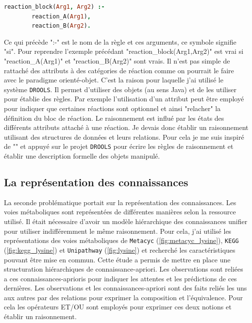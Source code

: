 \begin{refsegment}
\begin{lstlisting}[basicstyle=\small\normalfont\ttfamily,language=Prolog]
    reaction_block(Arg1, Arg2) :-
        reaction_A(Arg1),
        reaction_B(Arg2).
\end{lstlisting}

Ce qui précède  ":-" est le nom de la règle et ces arguments, ce symbole signifie "si". Pour reprendre l'exemple précédant "reaction\_block(Arg1,Arg2)" est vrai si "reaction\_A(Arg1)" et "reaction\_B(Arg2)" sont vrais. Il n'est pas simple de rattaché des attributs à des catégories de réaction comme on pourrait le faire avec le paradigme orienté-objet. C'est la raison pour laquelle j'ai utilisé le système \texttt{DROOLS}. Il permet d'utiliser des objets (au sens Java)  et de les utiliser pour établie des règles. Par exemple l'utilisation d'un attribut peut être employé pour indiquer que certaines réactions sont optionnel et ainsi "relacher" la définition du bloc de réaction. Le raisonnement est influé par les états des différents attributs attaché à une réaction. Je devais donc établir un raisonnement utilisant des structures de données et leurs relations. Pour cela je me suis inspiré de "" \cite{amir1999object} et appuyé sur le projet \texttt{DROOLS} \cite{mcwhirter2001drools} pour écrire les règles de raisonnement et établir une description formelle des objets manipulé.

\subsection{La représentation des connaissances}

La seconde problématique portait sur la représentation des connaissances. Les voies métaboliques sont représentées de différentes manières selon la ressource utilisé. Il était nécessaire d'avoir un modèle hiérarchique des connaissances unifier pour utiliser indifféremment le même raisonnement. Pour cela, j'ai utilisé les représentations des voies métaboliques de \texttt{Metacyc} (\cref{fig:metacyc_lysine}), \texttt{KEGG} (\cref{fig:kegg_lysine}) et \texttt{Unipathway} (\cref{fig:lysine}) et recherché les caractéristiques pouvant être mise en commun. Cette étude a permis de mettre en place une structuration hiérarchiques de connaissance-apriori. Les observations sont reliées a ces connaissances-aprioris pour indiquer les attentes et les prédictions de ces dernières. Les observations et les connaissances-apriori sont des faits reliés les uns aux autres par des relations pour exprimer la composition et l'équivalence. Pour cela les opérateurs ET/OU sont employés pour exprimer ces deux notions et établir un raisonnement.


\end{refsegment}
